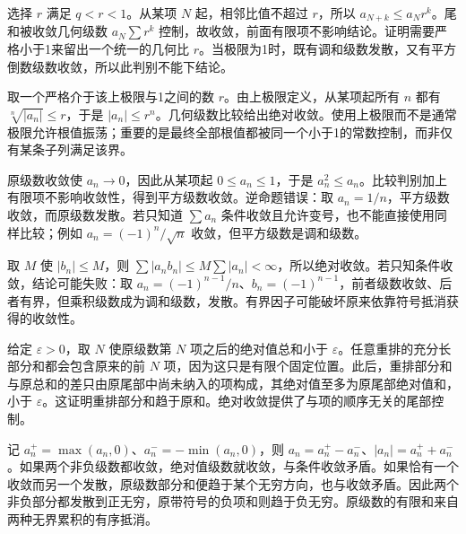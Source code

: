 \documentclass[UTF8,12pt,a4paper,fontset=fandol]{ctexart}
\begin{document}
\begin{solve}\label{ans:c29q5}
选择 $r$ 满足 $q<r<1$。从某项 $N$ 起，相邻比值不超过 $r$，所以 $a_{N+k}\le a_Nr^k$。尾和被收敛几何级数 $a_N\sum r^k$ 控制，故收敛，前面有限项不影响结论。证明需要严格小于1来留出一个统一的几何比 $r$。当极限为1时，既有调和级数发散，又有平方倒数级数收敛，所以此判别不能下结论。
\end{solve}

\begin{solve}\label{ans:c29q6}
取一个严格介于该上极限与1之间的数 $r$。由上极限定义，从某项起所有 $n$ 都有 $\sqrt[n]{|a_n|}\le r$，于是 $|a_n|\le r^n$。几何级数比较给出绝对收敛。使用上极限而不是通常极限允许根值振荡；重要的是最终全部根值都被同一个小于1的常数控制，而非仅有某条子列满足该界。
\end{solve}

\begin{solve}\label{ans:c29q7}
原级数收敛使 $a_n\to0$，因此从某项起 $0\le a_n\le1$，于是 $a_n^2\le a_n$。比较判别加上有限项不影响收敛性，得到平方级数收敛。逆命题错误：取 $a_n=1/n$，平方级数收敛，而原级数发散。若只知道 $\sum a_n$ 条件收敛且允许变号，也不能直接使用同样比较；例如 $a_n=(-1)^n/\sqrt n$ 收敛，但平方级数是调和级数。
\end{solve}

\begin{solve}\label{ans:c29q8}
取 $M$ 使 $|b_n|\le M$，则 $\sum|a_nb_n|\le M\sum|a_n|<\infty$，所以绝对收敛。若只知条件收敛，结论可能失败：取 $a_n=(-1)^{n-1}/n$、$b_n=(-1)^{n-1}$，前者级数收敛、后者有界，但乘积级数成为调和级数，发散。有界因子可能破坏原来依靠符号抵消获得的收敛性。
\end{solve}

\begin{solve}\label{ans:c29q9}
给定 $\varepsilon>0$，取 $N$ 使原级数第 $N$ 项之后的绝对值总和小于 $\varepsilon$。任意重排的充分长部分和都会包含原来的前 $N$ 项，因为这只是有限个固定位置。此后，重排部分和与原总和的差只由原尾部中尚未纳入的项构成，其绝对值至多为原尾部绝对值和，小于 $\varepsilon$。这证明重排部分和趋于原和。绝对收敛提供了与项的顺序无关的尾部控制。
\end{solve}

\begin{solve}\label{ans:c29q10}
记 $a_n^+=\max(a_n,0)$、$a_n^-=-\min(a_n,0)$，则 $a_n=a_n^+-a_n^-$、$|a_n|=a_n^++a_n^-$。如果两个非负级数都收敛，绝对值级数就收敛，与条件收敛矛盾。如果恰有一个收敛而另一个发散，原级数部分和便趋于某个无穷方向，也与收敛矛盾。因此两个非负部分都发散到正无穷，原带符号的负项和则趋于负无穷。原级数的有限和来自两种无界累积的有序抵消。
\end{solve}
\end{document}
